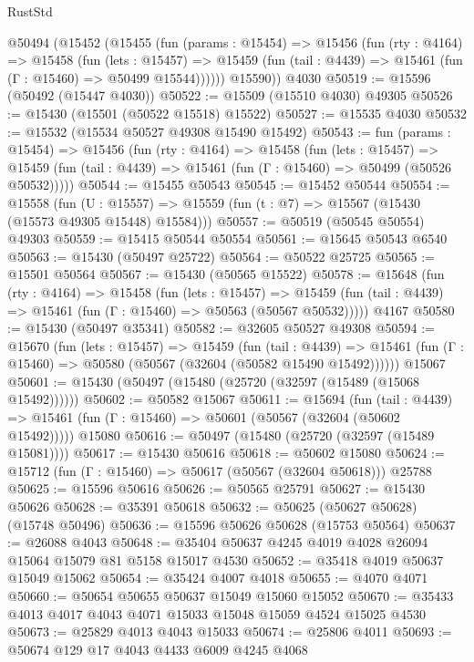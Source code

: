 \begin{lexlean}{RustStd}
\begin{coremodule}
    @50494
      (@15452
        (@15455
          (fun (params : @15454) =>
          @15456
            (fun (rty : @4164) =>
            @15458
              (fun (lets : @15457) =>
              @15459 (fun (tail : @4439) => @15461 (fun (Γ : @15460) => @50499 @15544))))))
        @15590))
    @4030
@50519 := @15596 (@50492 (@15447 @4030))
@50522 := @15509 (@15510 @4030) @49305
@50526 := @15430 (@15501 (@50522 @15518) @15522)
@50527 := @15535 @4030
@50532 := @15532 (@15534 @50527 @49308 @15490 @15492)
@50543 := fun (params : @15454) =>
  @15456
    (fun (rty : @4164) =>
    @15458
      (fun (lets : @15457) =>
      @15459 (fun (tail : @4439) => @15461 (fun (Γ : @15460) => @50499 (@50526 @50532)))))
@50544 := @15455 @50543
@50545 := @15452 @50544
@50554 := @15558
    (fun (U : @15557) => @15559 (fun (t : @7) => @15567 (@15430 (@15573 @49305 @15448) @15584)))
@50557 := @50519 (@50545 @50554) @49303
@50559 := @15415 @50544 @50554
@50561 := @15645 @50543 @6540
@50563 := @15430 (@50497 @25722)
@50564 := @50522 @25725
@50565 := @15501 @50564
@50567 := @15430 (@50565 @15522)
@50578 := @15648
    (fun (rty : @4164) =>
    @15458
      (fun (lets : @15457) =>
      @15459 (fun (tail : @4439) => @15461 (fun (Γ : @15460) => @50563 (@50567 @50532)))))
    @4167
@50580 := @15430 (@50497 @35341)
@50582 := @32605 @50527 @49308
@50594 := @15670
    (fun (lets : @15457) =>
    @15459
      (fun (tail : @4439) =>
      @15461 (fun (Γ : @15460) => @50580 (@50567 (@32604 (@50582 @15490 @15492))))))
    @15067
@50601 := @15430 (@50497 (@15480 (@25720 (@32597 (@15489 (@15068 @15492))))))
@50602 := @50582 @15067
@50611 := @15694
    (fun (tail : @4439) => @15461 (fun (Γ : @15460) => @50601 (@50567 (@32604 (@50602 @15492)))))
    @15080
@50616 := @50497 (@15480 (@25720 (@32597 (@15489 @15081))))
@50617 := @15430 @50616
@50618 := @50602 @15080
@50624 := @15712 (fun (Γ : @15460) => @50617 (@50567 (@32604 @50618))) @25788
@50625 := @15596 @50616
@50626 := @50565 @25791
@50627 := @15430 @50626
@50628 := @35391 @50618
@50632 := @50625 (@50627 @50628) (@15748 @50496)
@50636 := @15596 @50626 @50628 (@15753 @50564)
@50637 := @26088 @4043
@50648 := @35404 @50637 @4245 @4019 @4028 @26094 @15064 @15079 @81 @5158 @15017 @4530
@50652 := @35418 @4019 @50637 @15049 @15062
@50654 := @35424 @4007 @4018
@50655 := @4070 @4071
@50660 := @50654 @50655 @50637 @15049 @15060 @15052
@50670 := @35433 @4013 @4017 @4043 @4071 @15033 @15048 @15059 @4524 @15025 @4530
@50673 := @25829 @4013 @4043 @15033
@50674 := @25806 @4011
@50693 := @50674
    @129
    @17
    @4043
    @4433
    @6009
    @4245
    @4068

\end{coremodule}
\end{lexlean}
